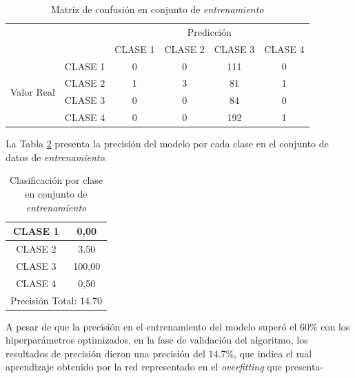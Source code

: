 \begin{table}[htbp]
	\centering
	\resizebox{10cm}{!} {
	\begin{tabular}{|c|l|c|c|c|c|}
		\hline
		\multicolumn{2}{|c|}{\multirow{2}[4]{*}{}} & \multicolumn{4}{c|}{Predicción} \bigstrut\\
		\cline{3-6}    \multicolumn{2}{|c|}{} & CLASE 1 & CLASE 2 & CLASE 3 & CLASE 4 \bigstrut\\
		\hline
		\multirow{4}[8]{*}{\begin{sideways}Valor Real\end{sideways}} & CLASE 1 & 0     & 0     & 111    & 0 \bigstrut\\
		\cline{2-6}          & CLASE 2 & 1     & 3     & 81    & 1 \bigstrut\\
		\cline{2-6}          & CLASE 3 & 0     & 0     & 84    & 0 \bigstrut\\
		\cline{2-6}          & CLASE 4 & 0     & 0     & 192    & 1 \bigstrut\\
		\hline
	\end{tabular}
	}
	\caption{Matriz de confusión en conjunto de \textit{entrenamiento}}
	\label{tab:MC_ALEX_OPT_2}%
\end{table}%

\newpage
La Tabla \ref{tab:Alexoptclases_2} presenta la precisión del modelo por cada clase en el conjunto de datos de \textit{entrenamiento}.

\begin{table}[htbp]
	\centering
	\begin{tabular}{|c|c|}
		\hline
		CLASE 1 & 0,00 \bigstrut\\
		\hline
		CLASE 2 & 3.50 \bigstrut\\
		\hline
		CLASE 3 & 100,00 \bigstrut\\
		\hline
		CLASE 4 & 0,50 \bigstrut\\
		\hline
		\multicolumn{2}{|c|}{Precisión Total: 14.70} \bigstrut\\
		\hline
	\end{tabular}%
	\caption{Clasificación por clase en conjunto de \textit{entrenamiento}
	}
	\label{tab:Alexoptclases_2}%
\end{table}%

A pesar de que la precisión en el entrenamiento del modelo superó el $60\%$ con los hiperparámetros optimizados, en la fase de validación del algoritmo, los resultados de precisión dieron una precisión del $14.7\%$, que indica el mal aprendizaje obtenido por la red representado en el \textit{overfitting} que presenta-


